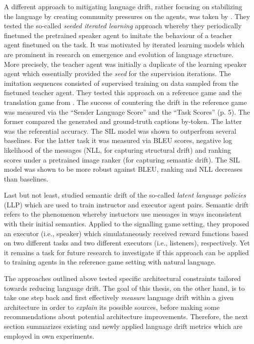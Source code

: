 A different approach to mitigating language drift, rather focusing on stabilizing the language by creating community pressures on the agents, was taken by \cite{lu2020countering}. They tested the so-called \textit{seeded iterated learning} approach whereby they periodically finetuned the pretrained speaker agent to imitate the behaviour of a teacher agent finetuned on the task. It was motivated by iterated learning models which are prominent in research on emergence and evolution of language structure. More precisely, the teacher agent was initially a duplicate of the learning speaker agent which essentially provided the \textit{seed} for the supervision iterations. The imitation sequences consisted of supervised training on data sampled from the fnetuned teacher agent. They tested this approach on a reference game and the translation game from \cite{lee2019countering}. The success of countering the drift in the reference game was measured via the ``Sender Language Score'' and the ``Task Scores'' (p. 5). The former compared the generated and ground-truth captions by-token. The latter was the referential accuracy. The SIL model was shown to outperfrom several baselines.
For the latter task it was measured via BLEU scores, negative log likelihood of the messages (NLL, for capturing structural drift) and ranking scores under a pretrained image ranker (for capturing semantic drift). The SIL model was shown to be more robust against BLEU, ranking and NLL decreases than baselines.

Last but not least, \cite{jacob2021multitasking} studied semantic drift of the so-called \textit{latent language policies} (LLP) which are used to train instructor and executor agent pairs. Semantic drift refers to the phenomenon whereby instuctors use messages in ways inconsistent with their initial semantics. Applied to the signalling game setting, they proposed an executor (i.e., speaker) which simulataneously received reward functions based on two different tasks and two different executors (i.e., listeners), respectively. Yet it remains a task for future research to investigate if this approach can be applied to training agents in the reference game setting with natural language.

The approaches outlined above tested specific architectural constraints tailored towards reducing language drift. The goal of this thesis, on the other hand, is to take one step back and first effectively \textit{measure} language drift within a given architecture in order to \textit{explain} its possible sources, before making some recommendations about potential architecture improvements. Therefore, the next section summarizes existing and newly applied language drift metrics which are employed in own experiments.  

